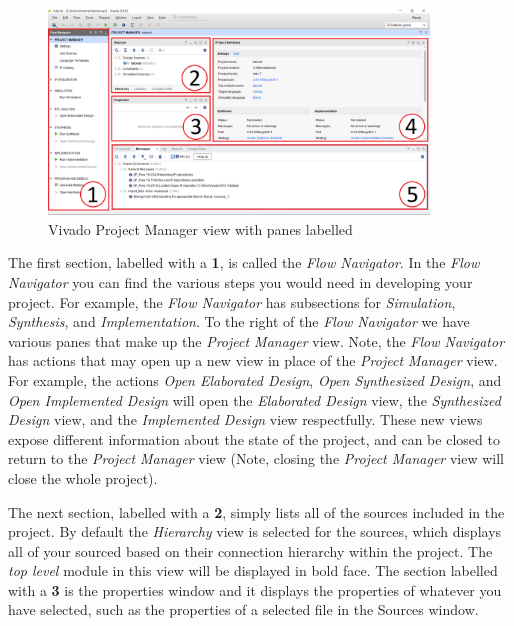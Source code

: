 \documentclass[11pt]{article}
\begin{document}
\begin{figure}[!h]
    \centering
    \includegraphics[width=0.9\textwidth]{images/vivado_layout.png}
    \caption{Vivado Project Manager view with panes labelled}
    \label{fig:vivado_layout}
\end{figure}

The first section, labelled with a \textbf{1}, is called the \textit{Flow Navigator}. In the \textit{Flow Navigator} you can find the various steps you would need in developing your project. For example, the \textit{Flow Navigator} has subsections for \textit{Simulation}, \textit{Synthesis}, and \textit{Implementation}. To the right of the \textit{Flow Navigator} we have various panes that make up the \textit{Project Manager} view. Note, the \textit{Flow Navigator} has actions that may open up a new view in place of the \textit{Project Manager} view. For example, the actions \textit{Open Elaborated Design}, \textit{Open Synthesized Design}, and \textit{Open Implemented Design} will open the \textit{Elaborated Design} view, the \textit{Synthesized Design} view, and the \textit{Implemented Design} view respectfully. These new views expose different information about the state of the project, and can be closed to return to the \textit{Project Manager} view (Note, closing the \textit{Project Manager} view will close the whole project).

The next section, labelled with a \textbf{2}, simply lists all of the sources included in the project. By default the \textit{Hierarchy} view is selected for the sources, which displays all of your sourced based on their connection hierarchy within the project. The \textit{top level} module in this view will be displayed in bold face. The section labelled with a \textbf{3} is the properties window and it displays the properties of whatever you have selected, such as the properties of a selected file in the Sources window.
\end{document}
